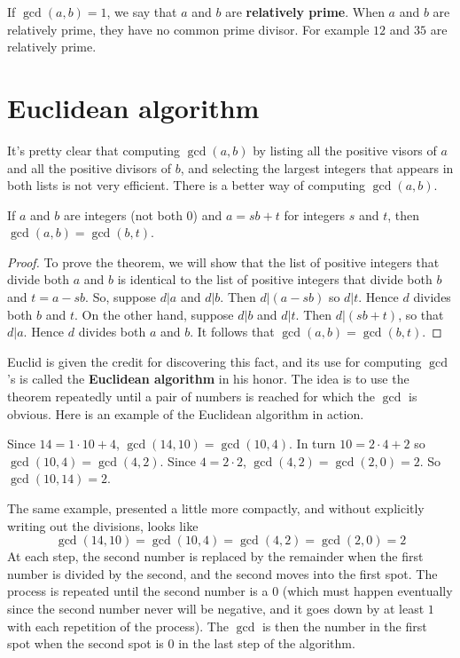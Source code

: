 If $\gcd(a,b)= 1$, we say that $a$ and $b$ are {\bfseries relatively prime}\label{def:rel prime}. When $a$ and $b$ are relatively prime, they
have no common prime divisor. For example $12$ and $35$ are relatively prime. 

\section{Euclidean algorithm}
It's pretty clear that computing $\gcd(a,b)$ by listing all the positive visors of $a$ and all the positive divisors of $b$, and selecting the largest integers that appears in both lists is not very efficient.  
There is a better way of 
computing $\gcd(a,b)$.

\begin{thm}
If $a$ and $b$ are integers (not both $0$)  and $a=sb+t$ for integers $s$ and $t$, 
then $\gcd(a,b)=\gcd(b,t)$.
\end{thm}
\begin{proof}
To prove the theorem, we will show that the list of positive integers that 
divide both $a$ and $b$
is identical to the list of positive integers that divide both $b$ and $t=a-sb$. So, suppose 
$d|a$ and $d|b$. Then $d|(a-sb)$ so $d|t$. Hence $d$ divides both $b$ and $t$. On the other
hand, suppose $d|b$ and $d|t$. Then $d|(sb+t)$, so that $d|a$. Hence $d$ divides both
$a$ and $b$. It follows that $\gcd(a,b)=\gcd(b,t)$.
\end{proof}


Euclid is given the credit for discovering this fact, and its use for computing $\gcd$'s is
called the {\bfseries Euclidean algorithm} in his honor. The idea is to
use the theorem repeatedly until a pair of numbers is reached for which the $\gcd$
is obvious.
Here is an example of
the Euclidean algorithm in action.

\begin{exmp}
Since $14=1\cdot 10 + 4$, $\gcd(14,10)=\gcd(10,4)$. In turn $10=2\cdot 4+2$ so
$\gcd(10,4)=\gcd(4,2)$. Since $4=2\cdot 2$, $\gcd(4,2)=\gcd(2,0)=2$. So $\gcd(10,14)=2$.

The same example, presented a little more compactly, and without explicitly 
writing out the divisions, looks like
$$
\gcd(14,10) = \gcd(10,4) = \gcd(4,2) = \gcd(2,0) = 2
$$
At each step, the second number is replaced by the remainder when the 
first number is divided by the second, and the second moves into the first spot.
The process is repeated until the second number is a $0$ (which must happen eventually
since the second number never will be negative, and it goes down by at least $1$ with each
repetition of the process). The $\gcd$ is then the number in the first spot when the second
spot is $0$ in the last step of the algorithm.
\end{exmp}

